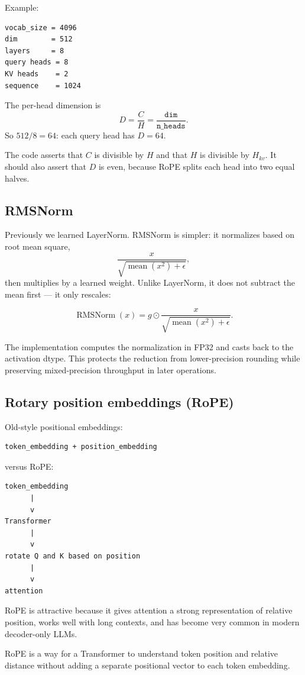 Example:
\begin{lstlisting}[style=shadedpython]
vocab_size = 4096
dim        = 512
layers     = 8
query heads = 8
KV heads    = 2
sequence    = 1024
\end{lstlisting}
The per-head dimension is
\[
  D=\frac{C}{H}=\frac{\texttt{dim}}{\texttt{n\_heads}}.
\]
So \(512/8=64\): each query head has \(D=64\).

The code asserts that \(C\) is divisible by \(H\) and that \(H\) is divisible
by \(H_{kv}\). It should also assert that \(D\) is even, because RoPE splits
each head into two equal halves.

\subsection{RMSNorm}

Previously we learned LayerNorm. RMSNorm is simpler: it normalizes based on
root mean square,
\[
  \frac{x}{\sqrt{\operatorname{mean}(x^2)+\epsilon}},
\]
then multiplies by a learned weight. Unlike LayerNorm, it does not subtract
the mean first --- it only rescales:

\[
  \operatorname{RMSNorm}(x)
  =g\odot\frac{x}{\sqrt{\operatorname{mean}(x^2)+\epsilon}}.
\]

The implementation computes the normalization in FP32 and casts back to the
activation dtype. This protects the reduction from lower-precision rounding
while preserving mixed-precision throughput in later operations.

\subsection{Rotary position embeddings (RoPE)}

Old-style positional embeddings:
\begin{lstlisting}[style=shadedpython]
token_embedding + position_embedding
\end{lstlisting}
versus RoPE:
\begin{lstlisting}[style=shadedpython,language={},basicstyle=\scriptsize\ttfamily]
token_embedding
      |
      v
Transformer
      |
      v
rotate Q and K based on position
      |
      v
attention
\end{lstlisting}
RoPE is attractive because it gives attention a strong representation of
relative position, works well with long contexts, and has become very common
in modern decoder-only LLMs.

RoPE is a way for a Transformer to understand token position and relative
distance without adding a separate positional vector to each token embedding.

